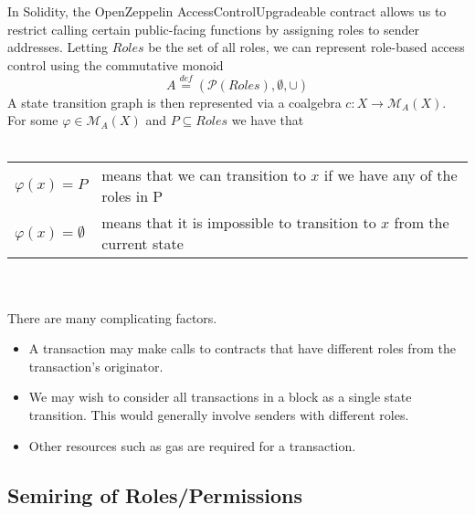 \documentclass{article}
\newcommand{\defeq}{\overset{\mathit{def}}{=}}
\begin{document}
In Solidity, the OpenZeppelin AccessControlUpgradeable contract allows us to restrict calling certain public-facing functions by assigning roles to sender addresses.
Letting $\mathit{Roles}$ be the set of all roles, we can represent role-based access control using the commutative monoid $$A \defeq (\mathcal P(\mathit{Roles}), \emptyset, \cup)$$
A state transition graph is then represented via a coalgebra $c : X \to \mathcal M_A(X)$. For some $\varphi \in \mathcal M_A(X)$ and $P \subseteq \mathit{Roles}$ we have that\\~\\
\begin{tabular}{ll}
$\varphi(x) = P$ & means that we can transition to $x$ if we have any of the roles in P \\
$\varphi(x) = \emptyset$ & means that it is impossible to transition to $x$ from the current state  
\end{tabular}\\~\\
There are many complicating factors. 

\begin{itemize}
\item A transaction may make calls to contracts that have different roles from the transaction's originator.
\item We may wish to consider all transactions in a block as a single state transition. This would generally involve senders with different roles.
\item Other resources such as gas are required for a transaction.
\end{itemize}

\subsection*{Semiring of Roles/Permissions}
\end{document}
